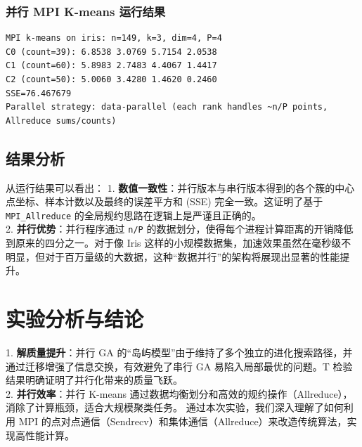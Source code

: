 \documentclass[11pt,a4paper]{article}
\begin{document}
\subsubsection{并行 MPI K-means 运行结果}
\begin{lstlisting}[backgroundcolor=\color{backcolour}]
MPI k-means on iris: n=149, k=3, dim=4, P=4
C0 (count=39): 6.8538 3.0769 5.7154 2.0538
C1 (count=60): 5.8983 2.7483 4.4067 1.4417
C2 (count=50): 5.0060 3.4280 1.4620 0.2460
SSE=76.467679
Parallel strategy: data-parallel (each rank handles ~n/P points, Allreduce sums/counts)
\end{lstlisting}

\subsection{结果分析}
从运行结果可以看出：
1. \textbf{数值一致性}：并行版本与串行版本得到的各个簇的中心点坐标、样本计数以及最终的误差平方和 (SSE) 完全一致。这证明了基于 \texttt{MPI\_Allreduce} 的全局规约思路在逻辑上是严谨且正确的。\\
2. \textbf{并行优势}：并行程序通过 \texttt{n/P} 的数据划分，使得每个进程计算距离的开销降低到原来的四分之一。对于像 Iris 这样的小规模数据集，加速效果虽然在毫秒级不明显，但对于百万量级的大数据，这种“数据并行”的架构将展现出显著的性能提升。

\section{实验分析与结论}
1. \textbf{解质量提升}：并行 GA 的“岛屿模型”由于维持了多个独立的进化搜索路径，并通过迁移增强了信息交换，有效避免了串行 GA 易陷入局部最优的问题。T 检验结果明确证明了并行化带来的质量飞跃。\\
2. \textbf{并行效率}：并行 K-means 通过数据均衡划分和高效的规约操作（Allreduce），消除了计算瓶颈，适合大规模聚类任务。
通过本次实验，我们深入理解了如何利用 MPI 的点对点通信（Sendrecv）和集体通信（Allreduce）来改造传统算法，实现高性能计算。
\end{document}
